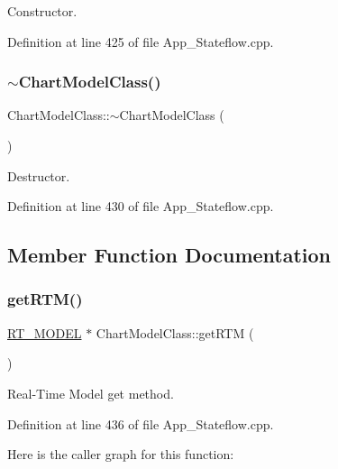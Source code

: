 Constructor. 



Definition at line 425 of file App\+\_\+\+Stateflow.\+cpp.

\mbox{\label{class_chart_model_class_a7b8440da4a5cbe07a6b0433db9a69f99}} 
\subsubsection{\texorpdfstring{$\sim$ChartModelClass()}{~ChartModelClass()}}
{\footnotesize\ttfamily Chart\+Model\+Class\+::$\sim$\+Chart\+Model\+Class (\begin{DoxyParamCaption}{ }\end{DoxyParamCaption})}



Destructor. 



Definition at line 430 of file App\+\_\+\+Stateflow.\+cpp.



\subsection{Member Function Documentation}
\mbox{\label{class_chart_model_class_a77ef9eda8f1e119f93ad3c87b3a54bbd}} 
\subsubsection{\texorpdfstring{getRTM()}{getRTM()}}
{\footnotesize\ttfamily \mbox{\hyperlink{_app___stateflow_8h_a6f32dbbab0d15102b3fe6ec3fe6a72ba}{R\+T\+\_\+\+M\+O\+D\+EL}} $\ast$ Chart\+Model\+Class\+::get\+R\+TM (\begin{DoxyParamCaption}{ }\end{DoxyParamCaption})}



Real-\/\+Time Model get method. 



Definition at line 436 of file App\+\_\+\+Stateflow.\+cpp.

Here is the caller graph for this function\+:
\mbox{\label{class_chart_model_class_ab32e055f4e5692dd69685b4befbea75d}} 
